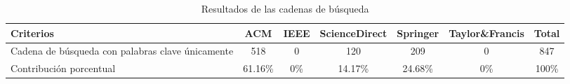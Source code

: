 \begin{table}[H]
	\centering
	\caption{Resultados de las cadenas de búsqueda}
	\label{table:bases-sin-exclusion}
	\begin{tabular}{|p{4.5cm}|c|c|c|c|c|c|}
		\hline
		\textbf{Criterios}                               & \textbf{ACM} & \textbf{IEEE} & \textbf{ScienceDirect} & \textbf{Springer} & \textbf{Taylor\&Francis} & \textbf{Total} \\
		\hline
		Cadena de búsqueda con palabras clave únicamente & 518          & 0             & 120                    & 209               & 0                        & 847            \\
		\hline
		Contribución porcentual                          & 61.16\%      & 0\%           & 14.17\%                & 24.68\%           & 0\%                      & 100\%          \\
		\hline
	\end{tabular}
\end{table}
